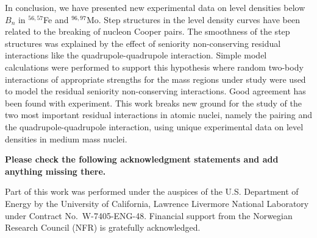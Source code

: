 \begin{multicols}{2}
In conclusion, we have presented new experimental data on level densities below
$B_n$ in $^{56,57}$Fe and $^{96,97}$Mo. Step structures in the level density 
curves have been related to the breaking of nucleon Cooper pairs. The 
smoothness of the step structures was explained by the effect of seniority 
non-conserving residual interactions like the quadrupole-quadrupole 
interaction. Simple model calculations were performed to support this 
hypothesis where random two-body interactions of appropriate strengths for the 
mass regions under study were used to model the residual seniority 
non-conserving interactions. Good agreement has been found with experiment. 
This work breaks new ground for the study of the two most important residual
interactions in atomic nuclei, namely the pairing and the quadrupole-quadrupole
interaction, using unique experimental data on level densities in medium mass 
nuclei.

\bf Please check the following acknowledgment statements and add anything 
missing there. \rm 

Part of this work was performed under the auspices of the U.S. Department of 
Energy by the University of California, Lawrence Livermore National Laboratory 
under Contract No.\ W-7405-ENG-48. Financial support from the Norwegian 
Research Council (NFR) is gratefully acknowledged. 


\end{multicols}
